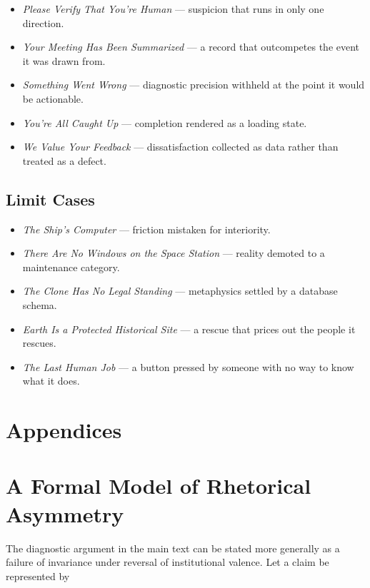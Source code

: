 \documentclass[11pt]{article}
\begin{document}
\begin{itemize}
  \item \textit{Please Verify That You're Human} --- suspicion that runs in only one direction.
  \item \textit{Your Meeting Has Been Summarized} --- a record that outcompetes the event it was drawn from.
  \item \textit{Something Went Wrong} --- diagnostic precision withheld at the point it would be actionable.
  \item \textit{You're All Caught Up} --- completion rendered as a loading state.
  \item \textit{We Value Your Feedback} --- dissatisfaction collected as data rather than treated as a defect.
\end{itemize}

\subsection*{Limit Cases}

\begin{itemize}
  \item \textit{The Ship's Computer} --- friction mistaken for interiority.
  \item \textit{There Are No Windows on the Space Station} --- reality demoted to a maintenance category.
  \item \textit{The Clone Has No Legal Standing} --- metaphysics settled by a database schema.
  \item \textit{Earth Is a Protected Historical Site} --- a rescue that prices out the people it rescues.
  \item \textit{The Last Human Job} --- a button pressed by someone with no way to know what it does.
\end{itemize}

\newpage
\section*{Appendices}

\appendix

\section{A Formal Model of Rhetorical Asymmetry}

The diagnostic argument in the main text can be stated more generally as a
failure of invariance under reversal of institutional valence. Let a claim be
represented by
\end{document}
